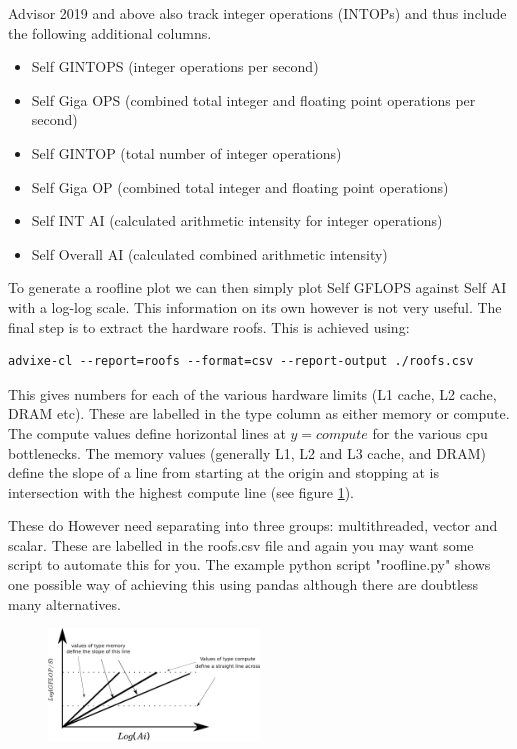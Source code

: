 \documentclass[a4paper, 11pt]{article}
\begin{document}
Advisor 2019 and above also track integer operations (INTOPs) and thus include the following additional columns.

\begin{itemize}
\item Self GINTOPS (integer operations per second)
\item Self Giga OPS (combined total integer and floating point operations per second)
\item  Self GINTOP (total number of integer operations)
\item Self Giga OP (combined total integer and floating point operations)
\item Self INT AI (calculated arithmetic intensity for integer operations)
\item Self Overall AI (calculated combined arithmetic intensity)
\end{itemize}

To generate a roofline plot we can then simply plot Self GFLOPS against Self AI with a log-log scale. This information on its own however is not very useful. The final step is to extract the hardware roofs. This is achieved using:
 \begin{verbatim}
advixe-cl --report=roofs --format=csv --report-output ./roofs.csv
\end{verbatim}
This gives numbers for each of the various hardware limits (L1 cache, L2 cache, DRAM etc). These are labelled in the type column as either memory or compute. The compute values define horizontal lines at $y=compute$ for the various cpu bottlenecks. The memory values (generally L1, L2 and L3 cache, and DRAM) define the slope of a line from starting at the origin and stopping at is intersection with the highest compute line (see figure \ref{roofline}). 

These do However need separating into three groups: multithreaded, vector and scalar. These are labelled in the roofs.csv file and again you may want some script to automate this for you. The example python script "roofline.py" shows one possible way of achieving this using pandas although there are doubtless many alternatives.

\begin{figure}
    \centering
    \includegraphics[width=0.5\textwidth]{roofline.png}
    \caption{\label{roofline}}
\end{figure}
\end{document}
